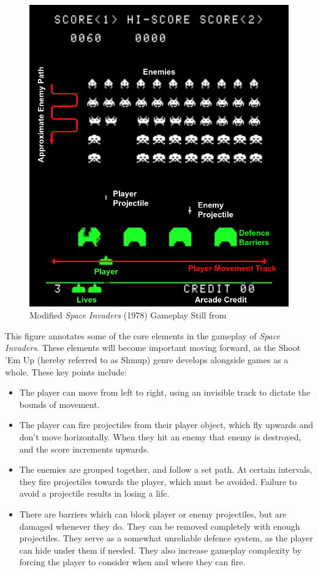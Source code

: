 \documentclass{scrartcl}
\let\cite\textcite
\begin{document}
\begin{figure}[ht]
  \centering
  \includegraphics[width=.6\columnwidth]{SpaceInvadersBreakdown.png}
  \caption[\textit{Space Invaders}]{Modified \textit{Space Invaders} (1978) Gameplay Still from \cite{Youtube001}}
\end{figure}

This figure annotates some of the core elements in the gameplay of \textit{Space Invaders}. These elements will become important moving forward, as the Shoot 'Em Up (hereby referred to as Shmup) genre develops alongside games as a whole. These key points include:

\begin{itemize}
  \item The player can move from left to right, using an invisible track to dictate the bounds of movement.
  \item The player can fire projectiles from their player object, which fly upwards and don't move horizontally. When they hit an enemy that enemy is destroyed, and the score increments upwards.
  \item The enemies are grouped together, and follow a set path. At certain intervals, they fire projectiles towards the player, which must be avoided. Failure to avoid a projectile results in losing a life.
  \item There are barriers which can block player or enemy projectiles, but are damaged whenever they do. They can be removed completely with enough projectiles. They serve as a somewhat unreliable defence system, as the player can hide under them if needed. They also increase gameplay complexity by forcing the player to consider when and where they can fire.
\end{itemize}
\end{document}
